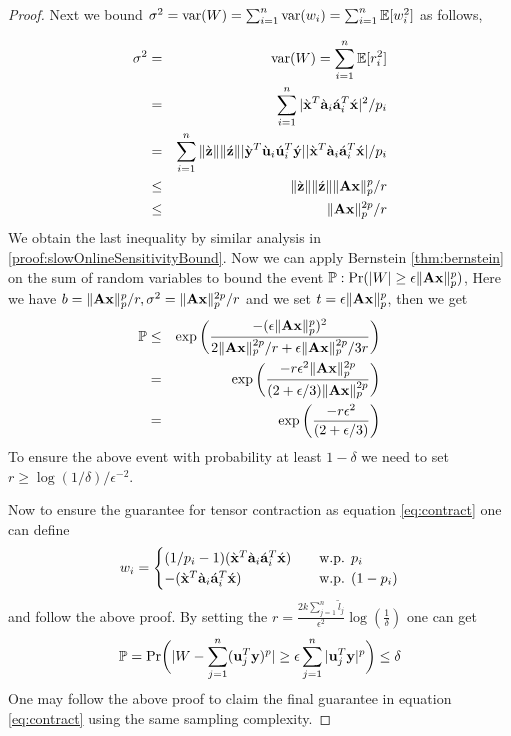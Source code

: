 \begin{proof}{\label{proof:slowOnlineGuarantee}}
Next we bound $\sigma^{2} = \mbox{var}(W) = \sum_{i=1}^{n} \mbox{var}(w_{i}) = \sum_{i=1}^{n}\~E[w_{i}^{2}]$ as follows,

\begin{eqnarray*}
 \sigma^{2} &=& \mbox{var}(W) = \sum_{i=1}^{n} \~E[r_{i}^{2}] \\
 &=& \sum_{i=1}^{n} |\grave{\*x}^{T}\grave{\*a}_{i}\acute{\*a}_{i}^{T}\acute{\*x}|^{2}/p_{i} \\
 &=& \sum_{i=1}^{n} \|\grave{\*z}\|\|\acute{\*z}\||\grave{\*y}^{T}\grave{\*u}_{i}\acute{\*u}_{i}^{T}\acute{\*y}||\grave{\*x}^{T}\grave{\*a}_{i}\acute{\*a}_{i}^{T}\acute{\*x}|/p_{i} \\
 &\leq& \|\grave{\*z}\|\|\acute{\*z}\| \|\*A\*x\|_{p}^{p}/r \\
 &\leq& \|\*A\*x\|_{p}^{2p}/r 
\end{eqnarray*}
% 
We obtain the last inequality by similar analysis in \ref{proof:slowOnlineSensitivityBound}. Now we can apply Bernstein \ref{thm:bernstein} on the sum of random variables to bound the event $\~P: \mbox{Pr}(|W| \geq \epsilon\|\*A\*x\|_{p}^{p})$, Here we have $b = \|\*A\*x\|_{p}^{p}/r, \sigma^{2} = \|\*A\*x\|_{p}^{2p}/r$ and we set $t = \epsilon\|\*A\*x\|_{p}^{p}$, then we get
\begin{eqnarray*}
 \~P &\leq& \exp\bigg(\frac{-(\epsilon\|\*A\*x\|_{p}^{p})^{2}}{2\|\*A\*x\|_{p}^{2p}/r+\epsilon\|\*A\*x\|_{p}^{2p}/3r}\bigg) \\
 &=& \exp\bigg(\frac{-r\epsilon^{2}\|\*A\*x\|_{p}^{2p}}{(2+\epsilon/3)\|\*A\*x\|_{p}^{2p}}\bigg) \\
 &=& \exp\bigg(\frac{-r\epsilon^{2}}{(2+\epsilon/3)}\bigg)
\end{eqnarray*}
To ensure the above event with probability at least $1-\delta$ we need to set $r \geq \log(1/\delta)/\epsilon^{-2}$. 

 Now to ensure the guarantee for tensor contraction as equation \eqref{eq:contract} one can define 
 \[ w_{i} =
  \begin{cases}
   (1/p_{i}-1)(\grave{\*x}^{T}\grave{\*a}_{i}\acute{\*a}_{i}^{T}\acute{\*x})  & \quad \text{w.p. } p_{i}\\
   -(\grave{\*x}^{T}\grave{\*a}_{i}\acute{\*a}_{i}^{T}\acute{\*x}) & \quad \text{w.p. } (1-p_{i})
  \end{cases}
 \]
and follow the above proof. By setting the $r = \frac{2k\sum_{j=1}^{n}\tilde{l}_{j}} {\epsilon^{2}} \log(\frac 1 \delta)$ one can get
$$\~P = \mbox{Pr}\bigg(|W - \sum_{j=1}^{n} (\*u_{j}^{T}\*y)^{p}| \geq \epsilon \sum_{j=1}^{n} |\*u_{j}^{T}\*y|^{p}\bigg) \leq \delta$$
One may follow the above proof to claim the final guarantee in equation \ref{eq:contract} using the same sampling complexity.
\end{proof}
% 
